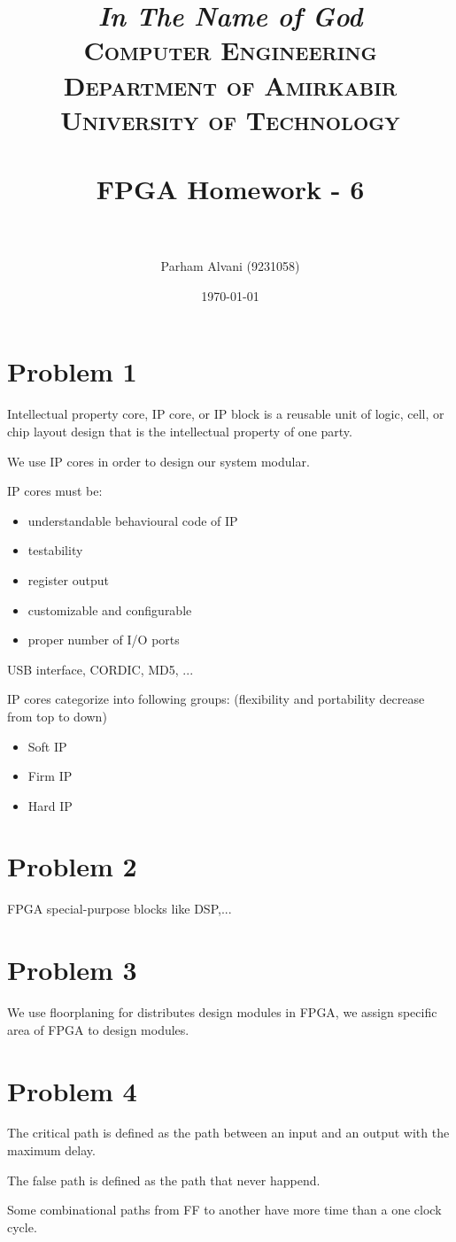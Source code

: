 \documentclass[paper=a4, fontsize=11pt]{scrartcl} %
\title{
\normalfont \normalsize
\textit{In The Name of God} \\
\textsc{Computer Engineering Department of Amirkabir University of Technology} \\ [25pt]
\horrule{0.5pt} \\[0.4cm] %
\huge FPGA Homework - 6 \\ %
\horrule{2pt} \\[0.5cm] %
}
\author{Parham Alvani (9231058)}
\date{\normalsize\today}
\numberwithin{equation}{section} %
\numberwithin{figure}{section} %
\numberwithin{table}{section} %
\begin{document}
\maketitle


\section{Problem 1}
\par Intellectual property core, IP core, or IP block is a reusable unit of
logic, cell, or chip layout design that is the intellectual property of one party.
\par We use IP cores in order to design our system modular.
\par IP cores must be:
\begin{itemize}
	\item
		understandable behavioural code of IP
	\item
		testability
	\item
		register output
	\item
		customizable and configurable
	\item
		proper number of I/O ports
\end{itemize}
\par USB interface, CORDIC, MD5, ...
\par IP cores categorize into following groups:
(flexibility and portability decrease from top to down)
\begin{itemize}
	\item
		Soft IP
	\item
		Firm IP
	\item
		Hard IP
\end{itemize}


\section{Problem 2}
\par FPGA special-purpose blocks like DSP,...


\section{Problem 3}
\par We use floorplaning for distributes design modules in FPGA, we assign
specific area of FPGA to design modules.


\section{Problem 4}
\par The critical path is defined as the path between an input and an output with the maximum delay.
\par The false path is defined as the path that never happend.
\par Some combinational paths from FF to another have more time than a one clock cycle.
\end{document}
